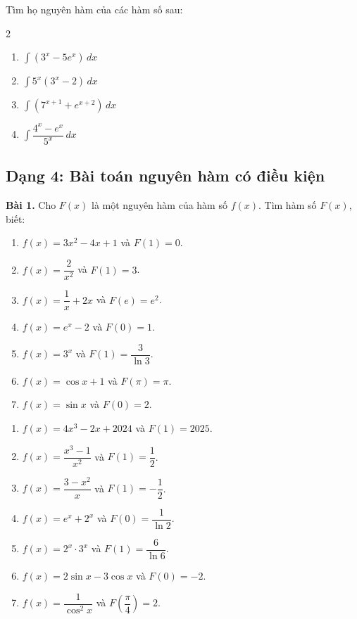 \documentclass[12pt]{article}
\begin{document}
	\begin{btdo}
		Tìm họ nguyên hàm của các hàm số sau:
		\begin{multicols}{2}
			\begin{enumerate}[label=\alph*)]
				\item $\displaystyle \int (3^x - 5e^x) \,dx$
				\item $\displaystyle \int 5^x(3^x - 2) \,dx$
				\item $\displaystyle \int (7^{x+1} + e^{x+2}) \,dx$
				\item $\displaystyle \int \dfrac{4^x - e^x}{5^x} \,dx$
			\end{enumerate}
		\end{multicols}
	\end{btdo}
	
	\subsection{Dạng 4: Bài toán nguyên hàm có điều kiện}
	
	\textbf{Bài 1.} Cho $F(x)$ là một nguyên hàm của hàm số $f(x)$. Tìm hàm số $F(x)$, biết:
	
	\begin{btxanh}
		\begin{enumerate}[label=\alph*)]
			\item $f(x) = 3x^2 - 4x + 1$ và $F(1) = 0$.
			\item $f(x) = \dfrac{2}{x^2}$ và $F(1) = 3$.
			\item $f(x) = \dfrac{1}{x} + 2x$ và $F(e) = e^2$.
			\item $f(x) = e^x - 2$ và $F(0) = 1$.
			\item $f(x) = 3^x$ và $F(1) = \dfrac{3}{\ln 3}$.
			\item $f(x) = \cos x + 1$ và $F(\pi) = \pi$.
			\item $f(x) = \sin x$ và $F(0) = 2$.
		\end{enumerate}
	\end{btxanh}
	
	\begin{btvang}
		\begin{enumerate}[label=\alph*), resume]
			\item $f(x) = 4x^3 - 2x + 2024$ và $F(1) = 2025$.
			\item $f(x) = \dfrac{x^3 - 1}{x^2}$ và $F(1) = \dfrac{1}{2}$.
			\item $f(x) = \dfrac{3 - x^2}{x}$ và $F(1) = -\dfrac{1}{2}$.
			\item $f(x) = e^x + 2^x$ và $F(0) = \dfrac{1}{\ln 2}$.
			\item $f(x) = 2^x \cdot 3^x$ và $F(1) = \dfrac{6}{\ln 6}$.
			\item $f(x) = 2\sin x - 3\cos x$ và $F(0) = -2$.
			\item $f(x) = \dfrac{1}{\cos^2 x}$ và $F\left(\dfrac{\pi}{4}\right) = 2$.
		\end{enumerate}
	\end{btvang}
	
\end{document}
